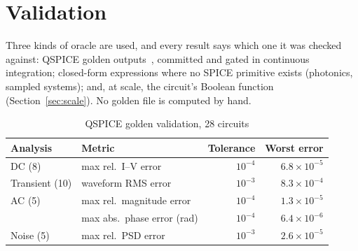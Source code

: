 \section{Validation}
\label{sec:validation}

Three kinds of oracle are used, and every result says which one it was checked against: QSPICE
golden outputs~\cite{qspice}, committed and gated in continuous integration; closed-form
expressions where no SPICE primitive exists (photonics, sampled systems); and, at scale, the
circuit's Boolean function (Section~\ref{sec:scale}). No golden file is computed by hand.

\begin{table}[t]
  \centering
  \caption{QSPICE golden validation, 28 circuits }
  \label{tab:golden}
  \begin{tabular}{@{}llrr@{}}
    \toprule
    Analysis & Metric & Tolerance & Worst error \\
    \midrule
    DC (8)        & max rel.\ I--V error       & $10^{-4}$ & $6.8\times10^{-5}$ \\
    Transient (10)& waveform RMS error         & $10^{-3}$ & $8.3\times10^{-4}$ \\
    AC (5)        & max rel.\ magnitude error  & $10^{-4}$ & $1.3\times10^{-5}$ \\
                  & max abs.\ phase error (rad)& $10^{-4}$ & $6.4\times10^{-6}$ \\
    Noise (5)     & max rel.\ PSD error        & $10^{-3}$ & $2.6\times10^{-5}$ \\
    \bottomrule
  \end{tabular}
\end{table}





